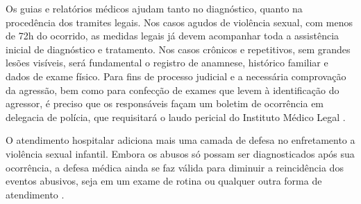 

Os guias e relatórios médicos ajudam tanto no diagnóstico, quanto na procedência dos tramites legais. Nos casos agudos de violência sexual, com menos de 72h do ocorrido, as medidas legais já devem acompanhar toda a assistência inicial de diagnóstico e tratamento. Nos casos crônicos e repetitivos, sem grandes lesões visíveis, será fundamental o registro de anamnese, histórico familiar e dados de exame físico. Para fins de processo judicial e a necessária comprovação da agressão, bem como para confecção de exames que levem à identificação do agressor, é preciso que os responsáveis façam um boletim de ocorrência em delegacia de polícia, que requisitará o laudo pericial do Instituto Médico Legal \cite{de2012violencia}. 

O atendimento hospitalar adiciona mais uma camada de defesa no enfretamento a violência sexual infantil. Embora os abusos só possam ser diagnosticados após sua ocorrência, a defesa médica ainda se faz válida para diminuir a reincidência dos eventos abusivos, seja em um exame de rotina ou qualquer outra forma de atendimento \cite{costa2019maus}.




